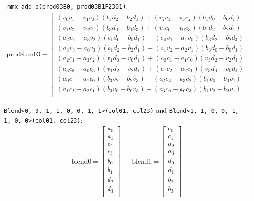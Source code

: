 \documentclass[fontsize = 10pt,DIV = 13]{scrartcl}
\newcommand{\pth}[1]{\left(#1\right)}
\begin{document}
\texttt{_mmx_add_p(prod03B0, prod03B1P2301)}:
\begin{align*}
\mathrm{prodSum03} 
=
\begin{bmatrix}
	\pth{v_0c_1 - v_1c_0}\pth{b_3d_2 - b_2d_3} 
  + \pth{v_2c_3 - v_3c_2}\pth{b_1d_0 - b_0d_1}\\
	\pth{v_1c_2 - v_2c_1}\pth{b_3d_0 - b_0d_3}
  + \pth{v_3c_0 - v_0c_3}\pth{b_1d_2 - b_2d_1}\\
	\pth{a_2v_3 - a_3v_2}\pth{b_1d_0 - b_0d_1}
  + \pth{a_0v_1 - a_1v_0}\pth{b_3d_2 - b_2d_3}\\
	\pth{a_3v_0 - a_0v_3}\pth{b_1d_2 - b_2d_1}
  + \pth{a_1v_2 - a_2v_1}\pth{b_3d_0 - b_0d_3}\\
	\pth{a_2c_3 - a_3c_2}\pth{v_1d_0 - v_0d_1}
  +	\pth{a_0c_1 - a_1c_0}\pth{v_3d_2 - v_2d_3}\\
	\pth{a_3c_0 - a_0c_3}\pth{v_1d_2 - v_2d_1}
  + \pth{a_1c_2 - a_2c_1}\pth{v_3d_0 - v_0d_3}\\
	\pth{a_0c_1 - a_1c_0}\pth{b_3v_2 - b_2v_3}
  + \pth{a_2c_3 - a_3c_2}\pth{b_1v_0 - b_0v_1}\\
	\pth{a_1c_2 - a_2c_1}\pth{b_3v_0 - b_0v_3}
  + \pth{a_3c_0 - a_0c_3}\pth{b_1v_2 - b_2v_1}\\
\end{bmatrix}
\end{align*}





\texttt{Blend<0, 0, 1, 1, 0, 0, 1, 1>(col01, col23)} and \newline
\texttt{Blend<1, 1, 0, 0, 1, 1, 0, 0>(col01, col23)}:
\begin{align*}
\mathrm{blend0} 
=
\begin{bmatrix}
a_0\\
a_1\\
c_2\\
c_3\\
b_0\\
b_1\\
d_2\\
d_3\\
\end{bmatrix}
&&
\mathrm{blend1} 
=
\begin{bmatrix}
c_0\\
c_1\\
a_2\\
a_3\\
d_0\\
d_1\\
b_2\\
b_3\\
\end{bmatrix}
\end{align*}
\end{document}
